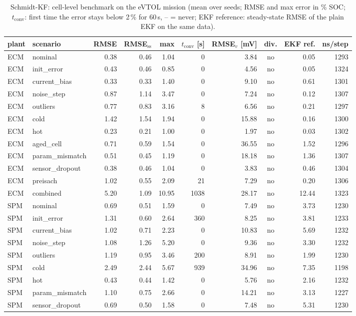 \begin{table}[H]\centering\footnotesize\setlength{\tabcolsep}{4pt}
\caption{Schmidt-KF: cell-level benchmark on the eVTOL mission (mean over seeds; RMSE and max error in \% SOC; $t_\mathrm{conv}$: first time the error stays below 2\,\% for 60\,s, -- = never; EKF reference: steady-state RMSE of the plain EKF on the same data).}\label{tab:cell_SchmidtKF}
\begin{tabular}{llrrrrrcrr}\toprule
plant & scenario & RMSE & RMSE$_\mathrm{ss}$ & max & $t_\mathrm{conv}$ [s] & RMSE$_v$ [mV] & div. & EKF ref. & ns/step \\ \midrule
ECM & nominal & 0.38 & 0.46 & 1.04 & 0 & 3.84 & no & 0.05 & 1293 \\
ECM & init\_error & 0.43 & 0.46 & 0.85 & 0 & 4.56 & no & 0.05 & 1324 \\
ECM & current\_bias & 0.33 & 0.33 & 1.40 & 0 & 9.10 & no & 0.61 & 1301 \\
ECM & noise\_step & 0.87 & 1.14 & 3.47 & 0 & 7.24 & no & 0.12 & 1307 \\
ECM & outliers & 0.77 & 0.83 & 3.16 & 8 & 6.56 & no & 0.21 & 1297 \\
ECM & cold & 1.42 & 1.54 & 1.94 & 0 & 15.88 & no & 0.16 & 1300 \\
ECM & hot & 0.23 & 0.21 & 1.00 & 0 & 1.97 & no & 0.03 & 1302 \\
ECM & aged\_cell & 0.71 & 0.59 & 1.54 & 0 & 36.55 & no & 1.52 & 1296 \\
ECM & param\_mismatch & 0.51 & 0.45 & 1.19 & 0 & 18.18 & no & 1.36 & 1307 \\
ECM & sensor\_dropout & 0.38 & 0.46 & 1.04 & 0 & 3.83 & no & 0.46 & 1304 \\
ECM & preisach & 1.02 & 0.55 & 2.09 & 21 & 7.29 & no & 0.20 & 1306 \\
ECM & combined & 5.20 & 1.09 & 10.95 & 1038 & 28.17 & no & 12.44 & 1323 \\
\midrule
SPM & nominal & 0.69 & 0.51 & 1.59 & 0 & 7.49 & no & 3.73 & 1230 \\
SPM & init\_error & 1.31 & 0.60 & 2.64 & 360 & 8.25 & no & 3.81 & 1233 \\
SPM & current\_bias & 1.02 & 0.71 & 2.23 & 0 & 10.83 & no & 5.69 & 1232 \\
SPM & noise\_step & 1.08 & 1.26 & 5.20 & 0 & 9.36 & no & 3.30 & 1232 \\
SPM & outliers & 1.19 & 0.95 & 3.46 & 200 & 8.91 & no & 1.99 & 1230 \\
SPM & cold & 2.49 & 2.44 & 5.67 & 939 & 34.96 & no & 7.35 & 1198 \\
SPM & hot & 0.43 & 0.44 & 1.42 & 0 & 5.76 & no & 2.16 & 1232 \\
SPM & param\_mismatch & 1.10 & 0.75 & 2.66 & 0 & 14.21 & no & 3.13 & 1227 \\
SPM & sensor\_dropout & 0.69 & 0.50 & 1.58 & 0 & 7.48 & no & 5.31 & 1230 \\
\bottomrule\end{tabular}\end{table}

